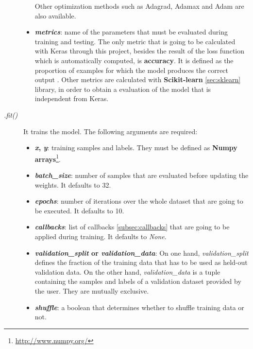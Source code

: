 \begin{description}
\begin{itemize}
		Other optimization methods such as Adagrad, Adamax and Adam are also available.
		
		\item \textbf{\textit{metrics}}: name of the parameters that must be evaluated during training and testing. The only metric that is going to be calculated with Keras through this project, besides the result of the loss function which is automatically computed, is \textbf{accuracy}. It is defined as the proportion of examples for which the model produces the correct output \cite{Goodfellow-et-al-2016}.			
		Other metrics are calculated with \textbf{Scikit-learn} \ref{sec:sklearn} library, in order to obtain a evaluation of the model that is independent from Keras.
	\end{itemize}
\end{description}

\begin{description}
	\item[\textit{.fit()}] It trains the model. The following arguments are required:
	\begin{itemize}
		\item \textbf{\textit{x}, \textit{y}}: training samples and labels. They must be defined as \textbf{Numpy arrays}\footnote{\url{http://www.numpy.org/}}.
		
		\item \textbf{\textit{batch\_size}}: number of samples that are evaluated before updating the weights. It defaults to 32.
		
		\item \textbf{\textit{epochs}}: number of iterations over the whole dataset that are going to be executed. It defaults to 10.
		
		\item \textbf{\textit{callbacks}}: list of callbacks \ref{subsec:callbacks} that are going to be applied during training. It defaults to \textit{None}.
		
		\item \textbf{\textit{validation\_split} or \textit{validation\_data}}: On one hand, \textit{validation\_split} defines the fraction of the training data that has to be used as held-out validation data. On the other hand, \textit{validation\_data} is a tuple containing the samples and labels of a validation dataset provided by the user. They are mutually exclusive.
		
		\item \textbf{\textit{shuffle}}: a boolean that determines whether to shuffle training data or not. 
	\end{itemize}
\end{description}

